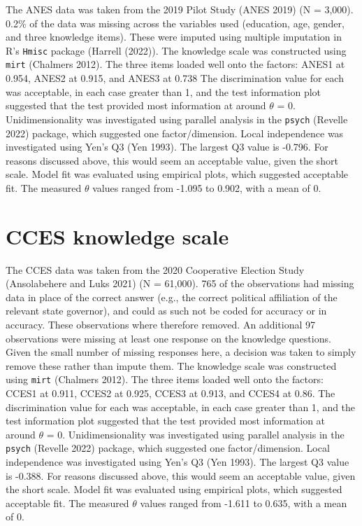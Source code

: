 \documentclass[11pt,halfline,a4paper,]{ouparticle}
\begin{document}
The ANES data was taken from the 2019 Pilot Study (ANES 2019) (N =
3,000). 0.2\% of the data was missing across the variables used
(education, age, gender, and three knowledge items). These were imputed
using multiple imputation in R's \texttt{Hmisc} package (Harrell
(2022)). The knowledge scale was constructed using \texttt{mirt}
(Chalmers 2012). The three items loaded well onto the factors: ANES1 at
0.954, ANES2 at 0.915, and ANES3 at 0.738 The discrimination value for
each was acceptable, in each case greater than 1, and the test
information plot suggested that the test provided most information at
around \(\theta\) = 0. Unidimensionality was investigated using parallel
analysis in the \texttt{psych} (Revelle 2022) package, which suggested
one factor/dimension. Local independence was investigated using Yen's Q3
(Yen 1993). The largest Q3 value is -0.796. For reasons discussed above,
this would seem an acceptable value, given the short scale. Model fit
was evaluated using empirical plots, which suggested acceptable fit. The
measured \(\theta\) values ranged from -1.095 to 0.902, with a mean of
0.

\hypertarget{cces-knowledge-scale}{%
\section{CCES knowledge scale}\label{cces-knowledge-scale}}

The CCES data was taken from the 2020 Cooperative Election Study
(Ansolabehere and Luks 2021) (N = 61,000). 765 of the observations had
missing data in place of the correct answer (e.g., the correct political
affiliation of the relevant state governor), and could as such not be
coded for accuracy or in accuracy. These observations where therefore
removed. An additional 97 observations were missing at least one
response on the knowledge questions. Given the small number of missing
responses here, a decision was taken to simply remove these rather than
impute them. The knowledge scale was constructed using \texttt{mirt}
(Chalmers 2012). The three items loaded well onto the factors: CCES1 at
0.911, CCES2 at 0.925, CCES3 at 0.913, and CCES4 at 0.86. The
discrimination value for each was acceptable, in each case greater than
1, and the test information plot suggested that the test provided most
information at around \(\theta\) = 0. Unidimensionality was investigated
using parallel analysis in the \texttt{psych} (Revelle 2022) package,
which suggested one factor/dimension. Local independence was
investigated using Yen's Q3 (Yen 1993). The largest Q3 value is -0.388.
For reasons discussed above, this would seem an acceptable value, given
the short scale. Model fit was evaluated using empirical plots, which
suggested acceptable fit. The measured \(\theta\) values ranged from
-1.611 to 0.635, with a mean of 0.
\end{document}
